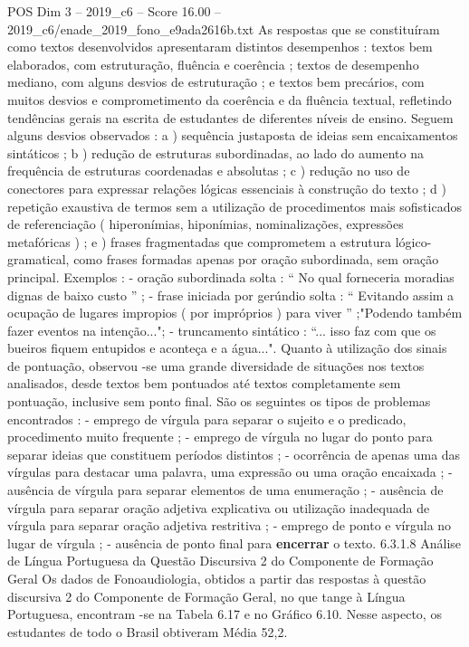 \begin{textsample}{POS Dim 3 – 2019\_c6 – Score 16.00 – 2019\_c6/enade\_2019\_fono\_e9ada2616b.txt}
As respostas que se constituíram como textos desenvolvidos apresentaram distintos desempenhos : textos bem elaborados, com estruturação, fluência e coerência ; textos de desempenho mediano, com alguns desvios de estruturação ; e textos bem precários, com muitos desvios e comprometimento da coerência e da fluência textual, refletindo tendências gerais na escrita de estudantes de diferentes níveis de ensino.
Seguem alguns desvios observados : a ) sequência justaposta de ideias sem encaixamentos sintáticos ; b ) redução de estruturas subordinadas, ao lado do aumento na frequência de estruturas coordenadas e absolutas ; c ) redução no uso de conectores para expressar relações lógicas essenciais à construção do texto ; d ) repetição exaustiva de termos sem a utilização de procedimentos mais sofisticados de referenciação ( hiperonímias, hiponímias, nominalizações, expressões metafóricas ) ; e ) frases fragmentadas que comprometem a estrutura lógico-gramatical, como frases formadas apenas por oração subordinada, sem oração principal.
Exemplos : - oração subordinada solta : “ No qual forneceria moradias dignas de baixo custo ” ; - frase iniciada por gerúndio solta : “ Evitando assim a ocupação de lugares impropios ( por impróprios ) para viver ” ;"Podendo também fazer eventos na intenção..."; - truncamento sintático : “... isso faz com que os bueiros fiquem entupidos e aconteça e a água...".
Quanto à utilização dos sinais de pontuação, observou -se uma grande diversidade de situações nos textos analisados, desde textos bem pontuados até textos completamente sem pontuação, inclusive sem ponto final.
São os seguintes os tipos de problemas encontrados : - emprego de vírgula para separar o sujeito e o predicado, procedimento muito frequente ; - emprego de vírgula no lugar do ponto para separar ideias que constituem períodos distintos ; - ocorrência de apenas uma das vírgulas para destacar uma palavra, uma expressão ou uma oração encaixada ; - ausência de vírgula para separar elementos de uma enumeração ; - ausência de vírgula para separar oração adjetiva explicativa ou utilização inadequada de vírgula para separar oração adjetiva restritiva ; - emprego de ponto e vírgula no lugar de vírgula ; - ausência de ponto final para \textbf{encerrar} o texto. 6.3.1.8 Análise de Língua Portuguesa da Questão Discursiva 2 do Componente de Formação Geral Os dados de Fonoaudiologia, obtidos a partir das respostas à questão discursiva 2 do Componente de Formação Geral, no que tange à Língua Portuguesa, encontram -se na Tabela 6.17 e no Gráfico 6.10.
Nesse aspecto, os estudantes de todo o Brasil obtiveram Média 52,2.

\end{textsample}
